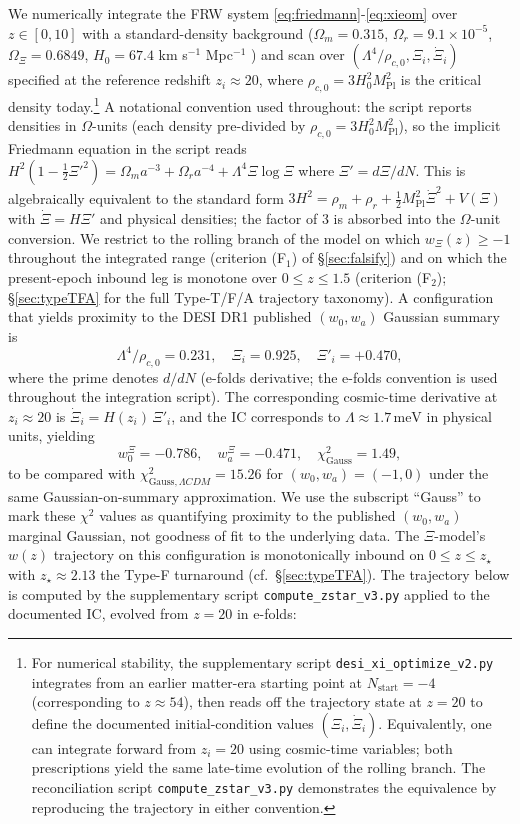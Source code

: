 \documentclass[11pt,reqno]{amsart}
\theoremstyle{plain}
\theoremstyle{definition}
\theoremstyle{remark}
\newcommand{\Pl}{\mathrm{Pl}}
\begin{document}
We numerically integrate the FRW system
\eqref{eq:friedmann}-\eqref{eq:xieom} over $z \in [0, 10]$ with a
standard-density background ($\Omega_m = 0.315$, $\Omega_r = 9.1\times10^{-5}$,
$\Omega_\Xi = 0.6849$, $H_0 = 67.4$ km s$^{-1}$ Mpc$^{-1}$
\cite{Planck2020}) and scan over $(\Lambda^{4}/\rho_{c,0}, \Xi_i, \dot\Xi_i)$
specified at the reference redshift $z_i \approx 20$, where $\rho_{c,0} = 3 H_0^{2} M_\Pl^{2}$
is the critical density today.\footnote{For numerical stability, the supplementary
script \texttt{desi\_xi\_optimize\_v2.py} integrates from an earlier matter-era
starting point at $N_\mathrm{start} = -4$ (corresponding to $z \approx 54$), then
reads off the trajectory state at $z = 20$ to define the documented initial-condition
values $(\Xi_i, \dot\Xi_i)$. Equivalently, one can integrate forward from
$z_i = 20$ using cosmic-time variables; both prescriptions yield the same
late-time evolution of the rolling branch. The reconciliation script
\texttt{compute\_zstar\_v3.py} demonstrates the equivalence by reproducing the
trajectory in either convention.}
A notational convention used throughout: the script reports densities in
$\Omega$-units (each density pre-divided by $\rho_{c,0} = 3 H_0^{2} M_\Pl^{2}$),
so the implicit Friedmann equation in the script reads $H^{2}(1 - \tfrac{1}{2}\Xi'^{2}) =
\Omega_m a^{-3} + \Omega_r a^{-4} + \Lambda^{4}\Xi\log\Xi$ where $\Xi' = d\Xi/dN$.
This is algebraically equivalent to the standard form $3 H^{2} = \rho_m + \rho_r +
\tfrac{1}{2}M_\Pl^{2}\dot\Xi^{2} + V(\Xi)$ with $\dot\Xi = H\Xi'$ and physical
densities; the factor of 3 is absorbed into the $\Omega$-unit conversion. We restrict to the rolling branch of the
model on which $w_\Xi(z) \geq -1$ throughout the integrated range
(criterion (F$_1$) of \S\ref{sec:falsify}) and on which the present-epoch
inbound leg is monotone over $0 \leq z \leq 1.5$ (criterion (F$_2$);
\S\ref{sec:typeTFA} for the full Type-T/F/A trajectory taxonomy).
A configuration that yields proximity to the DESI DR1 published
$(w_0, w_a)$ Gaussian summary is
\begin{equation}\label{eq:desibestfit}
  \Lambda^{4}/\rho_{c,0} = 0.231,
  \quad \Xi_i = 0.925,
  \quad \Xi'_i = +0.470,
\end{equation}
where the prime denotes $d/dN$ (e-folds derivative; the e-folds convention is
used throughout the integration script). The corresponding cosmic-time
derivative at $z_i \approx 20$ is $\dot\Xi_i = H(z_i)\,\Xi'_i$, and the IC
corresponds to $\Lambda \approx 1.7\,\text{meV}$ in physical units, yielding
\[
  w_0^{\Xi} = -0.786,\quad
  w_a^{\Xi} = -0.471,\quad
  \chi^{2}_{\text{Gauss}} = 1.49,
\]
to be compared with $\chi^{2}_{\text{Gauss},\Lambda CDM} = 15.26$ for
$(w_0, w_a) = (-1, 0)$ under the same Gaussian-on-summary
approximation. We use the subscript ``Gauss'' to mark these
$\chi^{2}$ values as quantifying proximity to the published
$(w_0, w_a)$ marginal Gaussian, not goodness of fit to the underlying
data. The $\Xi$-model's $w(z)$ trajectory on this configuration is
monotonically inbound on $0 \leq z \leq z_\star$ with $z_\star \approx 2.13$
the Type-F turnaround (cf.\ \S\ref{sec:typeTFA}). The trajectory below
is computed by the supplementary script \texttt{compute\_zstar\_v3.py}
applied to the documented IC, evolved from $z = 20$ in e-folds:
\end{document}
